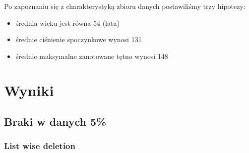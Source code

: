 \documentclass{classrep}
\begin{document}
{        Po zapoznaniu się z charakterystyką zbioru danych postawiliśmy trzy hipotezy:
        \begin{itemize}
            \item średnia wieku jest równa 54 (lata)
            \item średnie ciśnienie spoczynkowe wynosi 131
            \item średnie maksymalne zanotowane tętno wynosi 148
        \end{itemize}
    }

    \section{Wyniki}
    \label{results} {

        \subsection{Braki w danych 5\%}
        \label{results:5-percent} {

            \subsubsection{List wise deletion}
            \label{results:5-percent:list-wise} {

}}}
\end{document}

